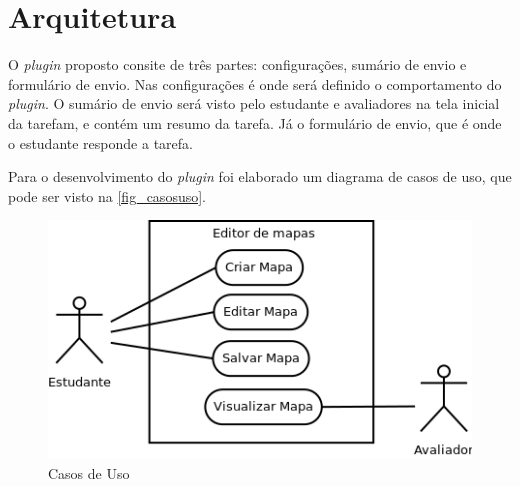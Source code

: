 \documentclass[
	12pt,				%
	openright,			%
	oneside,			%
	a4paper,			%
	english,			%
	french,				%
	spanish,			%
	brazil				%
	]{abntex2}
\begin{document}


\section{Arquitetura}

O \textit{plugin} proposto consite de três partes: configurações, sumário de envio e formulário de envio. Nas configurações é onde será definido o comportamento do \textit{plugin}. O sumário de envio será visto pelo estudante e avaliadores na tela inicial da tarefam, e contém um resumo da tarefa. Já o formulário de envio, que é onde o estudante responde a tarefa.

%

Para o desenvolvimento do \textit{plugin} foi elaborado um diagrama de casos de uso, que pode ser visto na \autoref{fig_casosuso}. 

\begin{figure}[!h]
	\caption{\label{fig_casosuso} Casos de Uso}
	\begin{center}
		\includegraphics[scale=0.7]{casosuso.png}
	\end{center}
\end{figure} 
\end{document}
